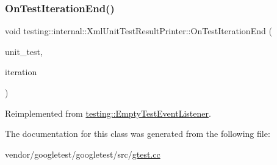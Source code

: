 \subsubsection{\texorpdfstring{On\+Test\+Iteration\+End()}{OnTestIterationEnd()}}
{\footnotesize\ttfamily void testing\+::internal\+::\+Xml\+Unit\+Test\+Result\+Printer\+::\+On\+Test\+Iteration\+End (\begin{DoxyParamCaption}\item[{const \hyperlink{classtesting_1_1_unit_test}{Unit\+Test} \&}]{unit\+\_\+test,  }\item[{int}]{iteration }\end{DoxyParamCaption})\hspace{0.3cm}{\ttfamily [virtual]}}



Reimplemented from \hyperlink{classtesting_1_1_empty_test_event_listener_a2253e5a18b3cf7bccd349567a252209d}{testing\+::\+Empty\+Test\+Event\+Listener}.



The documentation for this class was generated from the following file\+:\begin{DoxyCompactItemize}
\item 
vendor/googletest/googletest/src/\hyperlink{gtest_8cc}{gtest.\+cc}\end{DoxyCompactItemize}
